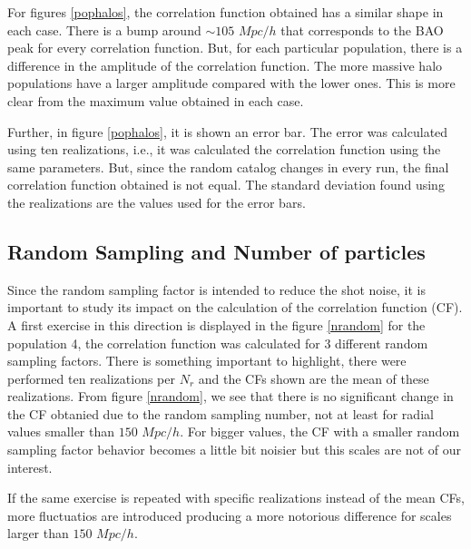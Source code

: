 For figures \ref{pophalos}, the correlation function obtained has a similar 
shape in each case. There is a bump around $\sim 105$ $Mpc/h$ that corresponds
to the BAO peak for every correlation function. 
But, for each particular population, there is a difference in the amplitude of the 
correlation function. The more massive halo populations have a larger amplitude
compared with the lower ones. This is more clear from the maximum value obtained in
each case. 

Further, in figure \ref{pophalos}, it is shown an error bar. 
The error was calculated using ten realizations, i.e., it was calculated
the correlation function using the same parameters. But, since the random catalog
changes in every run, the final correlation function obtained is not equal. 
The standard deviation found using the realizations
are the values used for the error bars. 

\subsection{ Random Sampling and Number of particles}


Since the random sampling factor is intended to reduce the shot 
noise, it is important to study its impact on the calculation
of the correlation function (CF). A first exercise in this direction
is displayed in the figure \ref{nrandom} for the population 4, 
the correlation function was calculated for 3 different random sampling factors. 
There is something important to highlight, there were performed
ten realizations per $N_{r}$ and the CFs shown are the mean of these
realizations. From figure \ref{nrandom}, we see that there is no 
significant change in the CF obtanied due to the random sampling number, 
not at least for radial values smaller than $150$ $Mpc/h$. 
For bigger values, the CF with a smaller random sampling factor 
behavior becomes a little bit noisier but this scales are not of our interest.

If the same exercise is repeated with specific realizations instead of the
mean CFs, more fluctuatios are introduced producing a more notorious difference
for scales larger than $150$ $Mpc/h$. 

